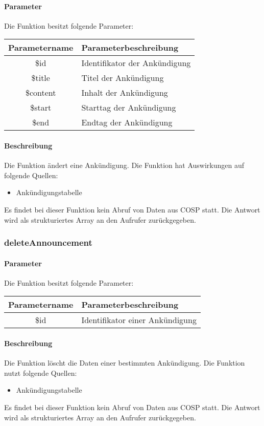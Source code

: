 \paragraph{Parameter} Die Funktion besitzt folgende Parameter:
\begin{table}[H]
	\begin{tabular}{|c|p{11cm}|}
		\hline
		\textbf{Parametername} & \textbf{Parameterbeschreibung} \\ \hline
		\$id      & Identifikator der Ankündigung \\ \hline
		\$title   & Titel der Ankündigung \\ \hline
		\$content & Inhalt der Ankündigung \\ \hline
		\$start   & Starttag der Ankündigung \\ \hline
		\$end     & Endtag der Ankündigung \\ \hline
	\end{tabular}
\end{table}
\paragraph{Beschreibung} Die Funktion ändert eine Ankündigung. Die Funktion hat Auswirkungen auf folgende Quellen:
\begin{itemize}
	\item Ankündigungstabelle
\end{itemize}
Es findet bei dieser Funktion kein Abruf von Daten aus {\glqq COSP\grqq} statt. Die Antwort wird als strukturiertes Array an den Aufrufer zurückgegeben.
\subsubsection{deleteAnnouncement}
\paragraph{Parameter} Die Funktion besitzt folgende Parameter:
\begin{table}[H]
	\begin{tabular}{|c|p{11cm}|}
		\hline
		\textbf{Parametername} & \textbf{Parameterbeschreibung} \\ \hline
		\$id & Identifikator einer Ankündigung\\ \hline
	\end{tabular}
\end{table}
\paragraph{Beschreibung} Die Funktion löscht die Daten einer bestimmten Ankündigung. Die Funktion nutzt folgende Quellen:
\begin{itemize}
	\item Ankündigungstabelle
\end{itemize}
Es findet bei dieser Funktion kein Abruf von Daten aus {\glqq COSP\grqq} statt. Die Antwort wird als strukturiertes Array an den Aufrufer zurückgegeben.
